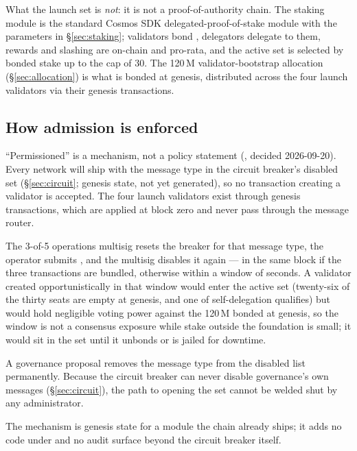 What the launch set is \emph{not}: it is not a proof-of-authority chain. The
staking module is the standard Cosmos SDK delegated-proof-of-stake module with
the parameters in \S\ref{sec:staking}; validators bond \kash{}, delegators
delegate to them, rewards and slashing are on-chain and pro-rata, and the
active set is selected by bonded stake up to the cap of 30. The 120\,M \kash{}
validator-bootstrap allocation (\S\ref{sec:allocation}) is what is bonded at
genesis, distributed across the four launch validators via their genesis
transactions.

\subsection{How admission is enforced}
\label{sec:admission}

``Permissioned'' is a mechanism, not a policy statement (, decided
2026-09-20). Every network will ship with the 
message type in the circuit breaker's disabled set (\S\ref{sec:circuit};
genesis state, not yet generated), so no transaction creating a validator is
accepted. The four launch validators exist through genesis transactions, which
are applied at block zero and never pass through the message router.

\begin{description}[style=nextline]
\item[Admitting an operator.] The 3-of-5 operations multisig resets the
  breaker for that message type, the operator submits
  , and the multisig disables it again --- in the same
  block if the three transactions are bundled, otherwise within a window of
  seconds. A validator created opportunistically in that window would enter
  the active set (twenty-six of the thirty seats are empty at genesis, and one
  \kash{} of self-delegation qualifies) but would hold negligible voting power
  against the 120\,M \kash{} bonded at genesis, so the window is not a
  consensus exposure while stake outside the foundation is small; it would sit
  in the set until it unbonds or is jailed for downtime.
\item[Going permissionless.] A governance proposal removes the message type
  from the disabled list permanently. Because the circuit breaker can never
  disable governance's own messages (\S\ref{sec:circuit}), the path to opening
  the set cannot be welded shut by any administrator.
\item[Nothing new to audit.] The mechanism is genesis state for a module the
  chain already ships; it adds no code under  and no audit surface
  beyond the circuit breaker itself.
\end{description}

